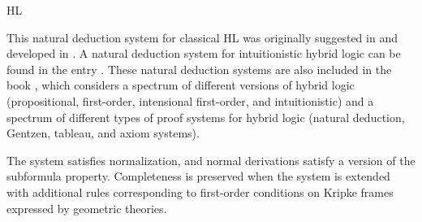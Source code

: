 \begin{entry}{HL}
\begin{history}
This natural deduction system for classical HL was originally suggested in
\cite{Brauner01c} and developed in \cite{Brauner01b}. A natural deduction system for intuitionistic hybrid logic can be found in the entry . These natural deduction systems are also included in the book \cite{Brauner11a}, which considers a spectrum of different versions of hybrid logic
(propositional, first-order, intensional first-order, and intuitionistic)
and a spectrum of different types of proof systems for
hybrid logic (natural deduction, Gentzen, tableau, and axiom systems).
\end{history}

\begin{technicalities}
The system satisfies normalization, and normal derivations satisfy a version of the subformula property. Completeness is preserved when the system is extended with additional rules corresponding to first-order conditions on Kripke frames expressed by geometric theories.
\end{technicalities}

\end{entry}
